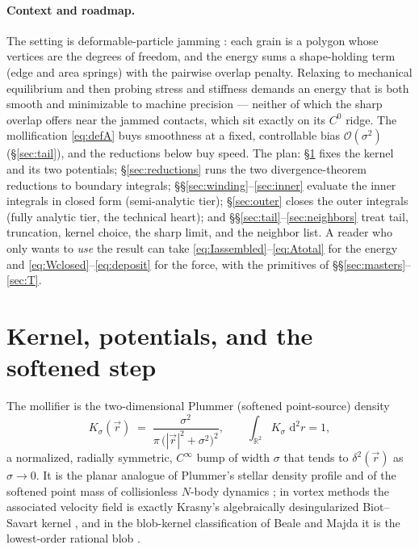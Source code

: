 \documentclass[11pt]{article}
\newcommand{\dd}{\,\mathrm{d}}
\begin{document}
\paragraph{Context and roadmap.}  The setting is deformable-particle jamming
\cite{Boromand2018}: each grain is a polygon whose vertices are the degrees of
freedom, and the energy sums a shape-holding term (edge and area springs) with the
pairwise overlap penalty.  Relaxing to mechanical equilibrium and then probing stress
and stiffness demands an energy that is both smooth and minimizable to machine
precision --- neither of which the sharp overlap offers near the jammed contacts, which
sit exactly on its $C^0$ ridge.  The mollification \eqref{eq:defA} buys smoothness at a
fixed, controllable bias $\mathcal O(\sigma^2)$ (\S\ref{sec:tail}), and the reductions
below buy speed.  The plan: \S\ref{sec:kernel} fixes the kernel and its two potentials;
\S\ref{sec:reductions} runs the two divergence-theorem reductions to boundary
integrals; \S\S\ref{sec:winding}--\ref{sec:inner} evaluate the inner integrals in
closed form (semi-analytic tier); \S\ref{sec:outer} closes the outer integrals (fully
analytic tier, the technical heart); and \S\S\ref{sec:tail}--\ref{sec:neighbors} treat
tail, truncation, kernel choice, the sharp limit, and the neighbor list.  A reader who
only wants to \emph{use} the result can take
\eqref{eq:Iassembled}--\eqref{eq:Atotal} for the energy and
\eqref{eq:Wclosed}--\eqref{eq:deposit} for the force, with the primitives of
\S\S\ref{sec:masters}--\ref{sec:T}.

\section{Kernel, potentials, and the softened step}
\label{sec:kernel}

The mollifier is the two-dimensional Plummer (softened point-source) density
\begin{equation}
  K_\sigma(\vec r) \;=\; \frac{\sigma^2}{\pi\,\bigl(|\vec r|^2+\sigma^2\bigr)^{2}},
  \qquad \int_{\mathbb R^2} K_\sigma \,\dd^2 r = 1 ,
  \label{eq:kernel}
\end{equation}
a normalized, radially symmetric, $C^\infty$ bump of width $\sigma$ that tends to
$\delta^2(\vec r)$ as $\sigma\to0$.  It is the planar analogue of Plummer's stellar
density profile \cite{Plummer1911} and of the softened point mass of collisionless
$N$-body dynamics \cite{Aarseth1963}; in vortex methods the associated velocity field
is exactly Krasny's algebraically desingularized Biot--Savart kernel
\cite{Chorin1973,Krasny1986}, and in the blob-kernel classification of Beale and
Majda it is the lowest-order rational blob \cite{BealeMajda1985}.
\end{document}
